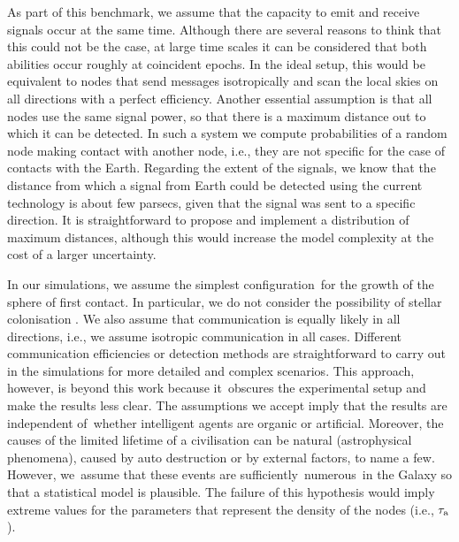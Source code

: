 \documentclass[crop]{CSLB}
\newcommand{\cetis}{nodes}
\begin{document}
As part of this benchmark, we assume that the capacity to emit and
receive signals occur at the same time.
%
Although there are several reasons to think that this could not be the
case, at large time scales it can be considered that both abilities
occur roughly at coincident epochs.
%
In the ideal setup, this would be equivalent to nodes that send
messages isotropically and scan the local skies on all directions with
a perfect efficiency.
%
Another essential assumption is that all \cetis{} use the same signal
power, so that there is a maximum distance out to which it can be
detected.
%
In such a system we compute probabilities of a random node making
contact with another node, i.e., they are not specific for the case of
contacts with the Earth.
%
Regarding the extent of the signals, we know that the distance from
which a signal from Earth could be detected using the current
technology is about few parsecs, given that the signal was sent to a
specific direction.
%
It is straightforward to propose and implement a distribution of
maximum distances, although this would increase the model complexity
at the cost of a larger uncertainty.



In our simulations, we assume the simplest configuration for the
growth of the sphere of first contact.
%
In particular, we do not consider the possibility of stellar
colonisation \citep[e.g.][]{newman_galactic_1981,
walters_interstellar_1980, starling_virulence_2013,
barlow_galactic_2012, jeong_large_2000, maccone_mathematical_2011}.
%
We also assume that communication is equally likely in all directions,
i.e., we assume isotropic communication in all cases.
%
Different communication efficiencies or detection methods are
straightforward to carry out in the simulations for more detailed and
complex scenarios.
%
This approach, however, is beyond this work because it obscures the
experimental setup and make the results less clear.
%
The assumptions we accept imply that the results are independent
of whether intelligent agents are organic or artificial.
%
Moreover, the causes of the limited lifetime of a civilisation can be
natural (astrophysical phenomena), caused by auto destruction or by
external factors, to name a few.
%
However, we assume that these events are sufficiently numerous in the
Galaxy so that a statistical model is plausible. The failure of this
hypothesis would imply extreme values for the parameters that
represent the density of the nodes (i.e., $\tau_{\rm a}$).
\end{document}
